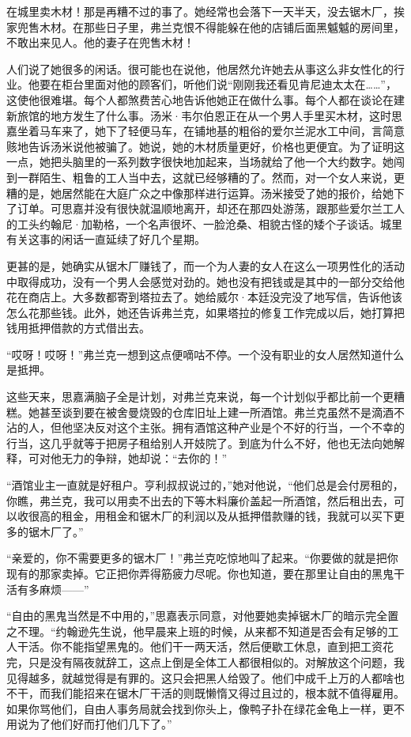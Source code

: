 \par 在城里卖木材！那是再糟不过的事了。她经常也会落下一天半天，没去锯木厂，挨家兜售木材。在那些日子里，弗兰克恨不得能躲在他的店铺后面黑魆魆的房间里，不敢出来见人。他的妻子在兜售木材！
\par 人们说了她很多的闲话。很可能也在说他，他居然允许她去从事这么非女性化的行业。他要在柜台里面对他的顾客们，听他们说“刚刚我还看见肯尼迪太太在……”，这使他很难堪。每个人都煞费苦心地告诉他她正在做什么事。每个人都在谈论在建新旅馆的地方发生了什么事。汤米·韦尔伯恩正在从一个男人手里买木材，这时思嘉坐着马车来了，她下了轻便马车，在铺地基的粗俗的爱尔兰泥水工中间，言简意赅地告诉汤米说他被骗了。她说，她的木材质量更好，价格也更便宜。为了证明这一点，她把头脑里的一系列数字很快地加起来，当场就给了他一个大约数字。她闯到一群陌生、粗鲁的工人当中去，这就已经够糟的了。然而，对一个女人来说，更糟的是，她居然能在大庭广众之中像那样进行运算。汤米接受了她的报价，给她下了订单。可思嘉并没有很快就温顺地离开，却还在那四处游荡，跟那些爱尔兰工人的工头约翰尼·加勒格，一个名声很坏、一脸沧桑、相貌古怪的矮个子谈话。城里有关这事的闲话一直延续了好几个星期。
\par 更甚的是，她确实从锯木厂赚钱了，而一个为人妻的女人在这么一项男性化的活动中取得成功，没有一个男人会感觉对劲的。她也没有把钱或是其中的一部分交给他花在商店上。大多数都寄到塔拉去了。她给威尔·本廷没完没了地写信，告诉他该怎么花那些钱。此外，她还告诉弗兰克，如果塔拉的修复工作完成以后，她打算把钱用抵押借款的方式借出去。
\par “哎呀！哎呀！”弗兰克一想到这点便嘀咕不停。一个没有职业的女人居然知道什么是抵押。
\par 这些天来，思嘉满脑子全是计划，对弗兰克来说，每一个计划似乎都比前一个更糟糕。她甚至谈到要在被舍曼烧毁的仓库旧址上建一所酒馆。弗兰克虽然不是滴酒不沾的人，但他坚决反对这个主张。拥有酒馆这种产业是个不好的行当，一个不幸的行当，这几乎就等于把房子租给别人开妓院了。到底为什么不好，他也无法向她解释，可对他无力的争辩，她却说：“去你的！”
\par “酒馆业主一直就是好租户。亨利叔叔说过的，”她对他说，“他们总是会付房租的，你瞧，弗兰克，我可以用卖不出去的下等木料廉价盖起一所酒馆，然后租出去，可以收很高的租金，用租金和锯木厂的利润以及从抵押借款赚的钱，我就可以买下更多的锯木厂了。”
\par “亲爱的，你不需要更多的锯木厂！”弗兰克吃惊地叫了起来。“你要做的就是把你现有的那家卖掉。它正把你弄得筋疲力尽呢。你也知道，要在那里让自由的黑鬼干活有多麻烦——”
\par “自由的黑鬼当然是不中用的，”思嘉表示同意，对他要她卖掉锯木厂的暗示完全置之不理。“约翰逊先生说，他早晨来上班的时候，从来都不知道是否会有足够的工人干活。你不能指望黑鬼的。他们干一两天活，然后便歇工休息，直到把工资花完，只是没有隔夜就辞工，这点上倒是全体工人都很相似的。对解放这个问题，我见得越多，就越觉得是有罪的。这只会把黑人给毁了。他们中成千上万的人都啥也不干，而我们能招来在锯木厂干活的则既懒惰又得过且过的，根本就不值得雇用。如果你骂他们，自由人事务局就会找到你头上，像鸭子扑在绿花金龟上一样，更不用说为了他们好而打他们几下了。”
